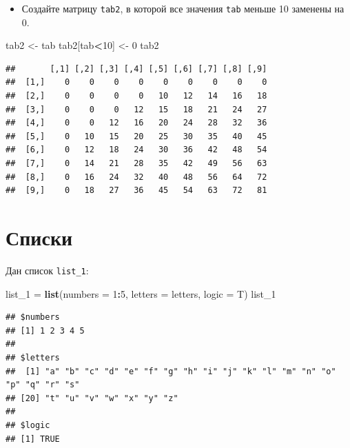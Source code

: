 \documentclass[]{book}
\newenvironment{Shaded}{\begin{snugshade}}{\end{snugshade}}
\newcommand{\KeywordTok}[1]{\textcolor[rgb]{0.13,0.29,0.53}{\textbf{#1}}}
\newcommand{\DataTypeTok}[1]{\textcolor[rgb]{0.13,0.29,0.53}{#1}}
\newcommand{\DecValTok}[1]{\textcolor[rgb]{0.00,0.00,0.81}{#1}}
\newcommand{\StringTok}[1]{\textcolor[rgb]{0.31,0.60,0.02}{#1}}
\newcommand{\OperatorTok}[1]{\textcolor[rgb]{0.81,0.36,0.00}{\textbf{#1}}}
\newcommand{\NormalTok}[1]{#1}
\providecommand{\tightlist}{%
  \setlength{\itemsep}{0pt}\setlength{\parskip}{0pt}}
\begin{document}
\begin{itemize}
\tightlist
\item
  Создайте матрицу \texttt{tab2}, в которой все значения \texttt{tab}
  меньше 10 заменены на 0.
\end{itemize}

\begin{Shaded}
\begin{Highlighting}[]
\NormalTok{tab2 <-}\StringTok{ }\NormalTok{tab}
\NormalTok{tab2[tab}\OperatorTok{<}\DecValTok{10}\NormalTok{] <-}\StringTok{ }\DecValTok{0}
\NormalTok{tab2}
\end{Highlighting}
\end{Shaded}

\begin{verbatim}
##       [,1] [,2] [,3] [,4] [,5] [,6] [,7] [,8] [,9]
##  [1,]    0    0    0    0    0    0    0    0    0
##  [2,]    0    0    0    0   10   12   14   16   18
##  [3,]    0    0    0   12   15   18   21   24   27
##  [4,]    0    0   12   16   20   24   28   32   36
##  [5,]    0   10   15   20   25   30   35   40   45
##  [6,]    0   12   18   24   30   36   42   48   54
##  [7,]    0   14   21   28   35   42   49   56   63
##  [8,]    0   16   24   32   40   48   56   64   72
##  [9,]    0   18   27   36   45   54   63   72   81
\end{verbatim}

\section{Списки}\label{solvlist_ta}

Дан список \texttt{list\_1}:

\begin{Shaded}
\begin{Highlighting}[]
\NormalTok{list_}\DecValTok{1}\NormalTok{ =}\StringTok{ }\KeywordTok{list}\NormalTok{(}\DataTypeTok{numbers =} \DecValTok{1}\OperatorTok{:}\DecValTok{5}\NormalTok{, }\DataTypeTok{letters =}\NormalTok{ letters, }\DataTypeTok{logic =}\NormalTok{ T)}
\NormalTok{list_}\DecValTok{1}
\end{Highlighting}
\end{Shaded}

\begin{verbatim}
## $numbers
## [1] 1 2 3 4 5
## 
## $letters
##  [1] "a" "b" "c" "d" "e" "f" "g" "h" "i" "j" "k" "l" "m" "n" "o" "p" "q" "r" "s"
## [20] "t" "u" "v" "w" "x" "y" "z"
## 
## $logic
## [1] TRUE
\end{verbatim}
\end{document}
